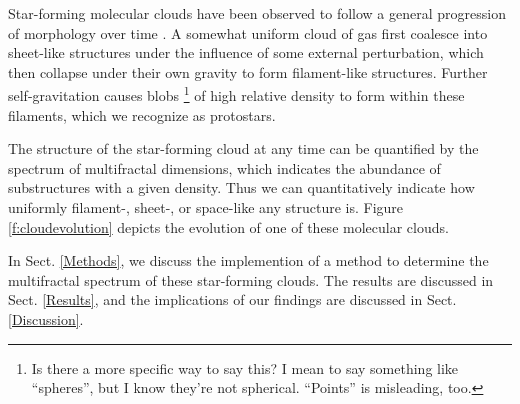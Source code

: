 \documentclass[iop]{emulateapj}
\begin{document}
Star-forming molecular clouds have been observed to follow a general progression of morphology over time \citep[see][for example]{Shu1987}. A somewhat uniform cloud of gas first coalesce into sheet-like structures under the influence of some external perturbation, which then collapse under their own gravity to form filament-like structures. Further self-gravitation causes blobs \footnote{Is there a more specific way to say this? I mean to say something like ``spheres'', but I know they're not spherical. ``Points'' is misleading, too.} of high relative density to form within these filaments, which we recognize as protostars.

The structure of the star-forming cloud at any time can be quantified by the spectrum of multifractal dimensions, which indicates the abundance of substructures with a given density. Thus we can quantitatively indicate how uniformly filament-, sheet-, or space-like any structure is. Figure \ref{f:cloudevolution} depicts the evolution of one of these molecular clouds.

In Sect. \ref{Methods}, we discuss the implemention of a method to determine the multifractal spectrum of these star-forming clouds. The results are discussed in Sect. \ref{Results}, and the implications of our findings are discussed in Sect. \ref{Discussion}.
\end{document}

